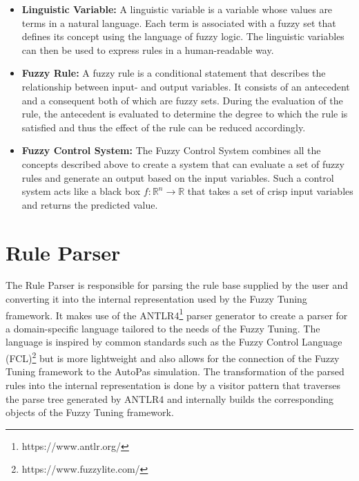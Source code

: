 \begin{itemize}

  \item \textbf{Linguistic Variable:} A linguistic variable is a variable whose values are terms in a natural language. Each term is associated with a fuzzy set that defines its concept using the language of fuzzy logic. The linguistic variables can then be used to express rules in a human-readable way.

  \item \textbf{Fuzzy Rule:} A fuzzy rule is a conditional statement that describes the relationship between input- and output variables. It consists of an antecedent and a consequent both of which are fuzzy sets. During the evaluation of the rule, the antecedent is evaluated to determine the degree to which the rule is satisfied and thus the effect of the rule can be reduced accordingly.

  \item \textbf{Fuzzy Control System:} The Fuzzy Control System combines all the concepts described above to create a system that can evaluate a set of fuzzy rules and generate an output based on the input variables. Such a control system acts like a black box $f: \mathbb{R}^n \rightarrow \mathbb{R}$ that takes a set of crisp input variables and returns the predicted value.
\end{itemize}






\section{Rule Parser}

The Rule Parser is responsible for parsing the rule base supplied by the user and converting it into the internal representation used by the Fuzzy Tuning framework. It makes use of the ANTLR4\footnote{https://www.antlr.org/} parser generator to create a parser for a domain-specific language tailored to the needs of the Fuzzy Tuning. The language is inspired by common standards such as the Fuzzy Control Language (FCL)\footnote{https://www.fuzzylite.com/} but is more lightweight and also allows for the connection of the Fuzzy Tuning framework to the AutoPas simulation. The transformation of the parsed rules into the internal representation is done by a visitor pattern that traverses the parse tree generated by ANTLR4 and internally builds the corresponding objects of the Fuzzy Tuning framework.

